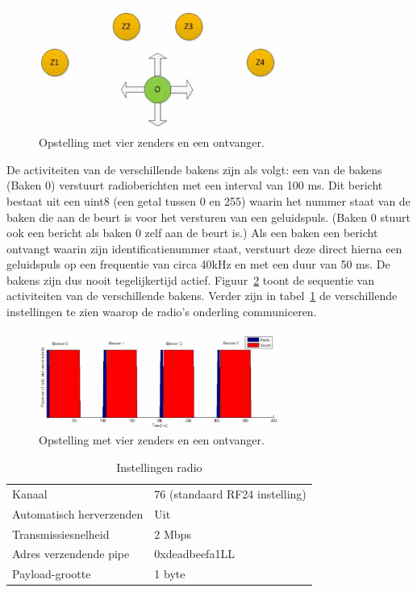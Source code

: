 \documentclass[a4paper,10pt]{article}
\begin{document}
\begin{figure}[ht!]
    \centering
    \includegraphics[width=0.7\textwidth]{opstelling.png}
    \caption{Opstelling met vier zenders en een ontvanger.}
    \label{fig:opstelling}
\end{figure}

De activiteiten van de verschillende bakens zijn als volgt: een van de bakens (Baken 0) verstuurt radioberichten met een interval van 100 ms. Dit bericht bestaat uit een uint8 (een getal tussen 0 en 255) waarin het nummer staat van de baken die aan de beurt is voor het versturen van een geluidspuls. (Baken 0 stuurt ook een bericht als baken 0 zelf aan de beurt is.) Als een baken een bericht ontvangt waarin zijn identiﬁcatienummer staat, verstuurt deze direct hierna een geluidspuls op een frequentie van circa 40kHz en met een duur van 50 ms. De bakens zijn dus nooit tegelijkertijd actief. Figuur~\ref{fig:tijdsdiagram_handleiding} toont de sequentie van activiteiten van de verschillende bakens. Verder zijn in tabel~\ref{table:instellingen} de verschillende instellingen te zien waarop de radio’s onderling communiceren.

\begin{figure}[ht!]
    \centering
    \includegraphics[width=0.7\textwidth]{tijdsdiagram_handleiding.png}
    \caption{Opstelling met vier zenders en een ontvanger.}
    \label{fig:tijdsdiagram_handleiding}
\end{figure}

\begin{table}[h]
    \begin{minipage}{\textwidth}
        \begin{tabular}{ l l }
            Kanaal                    & 76 (standaard RF24 instelling) \\
            Automatisch herverzenden  & Uit               \\
            Transmissiesnelheid       & 2 Mbps            \\
            Adres verzendende pipe    & 0xdeadbeefa1LL    \\
            Payload-grootte           & 1 byte
        \end{tabular}
        \caption{Instellingen radio}
        \label{table:instellingen}        
    \end{minipage}
\end{table}
\end{document}
